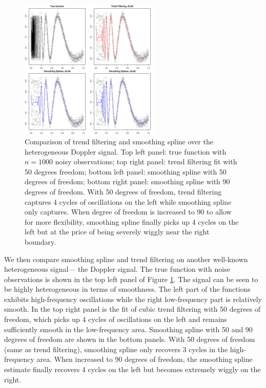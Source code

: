 \documentclass[a4paper]{article}
\begin{document}
\begin{figure}[t]
\centering
\includegraphics[width = 0.6\textwidth]{Figures/Figure5.pdf}
\caption{Comparison of trend filtering and smoothing spline over the heterogeneous Doppler signal. Top left panel: true function with $n = 1000$ noisy observations; top right panel: trend filtering fit with 50 degrees freedom; bottom left panel: smoothing spline with 50 degrees of freedom; bottom right panel: smoothing spline with 90 degrees of freedom. With 50 degrees of freedom, trend filtering captures 4 cycles of oscillations on the left while smoothing spline only captures. When degree of freedom is increased to 90 to allow for more flexibility, smoothing spline finally picks up 4 cycles on the left but at the price of being severely wiggly near the right boundary.}
\label{fig:Figure5_ssvstfdoppler}
\end{figure}

We then compare smoothing spline and trend filtering on another well-known heterogeneous signal--- the Doppler signal. The true function with noise observations is shown in the top left panel of Figure \ref{fig:Figure5_ssvstfdoppler}. The signal can be seen to be highly heterogeneous in terms of smoothness. The left part of the functions exhibits high-frequency oscillations while the right low-frequency part is relatively smooth. In the top right panel is the fit of cubic trend filtering with 50 degrees of freedom, which picks up 4 cycles of oscillations on the left and remains sufficiently smooth in the low-frequency area. Smoothing spline with 50 and 90 degrees of freedom are shown in the bottom panels. With 50 degrees of freedom (same as trend filtering), smoothing spline only recovers 3 cycles in the high-frequency area. When increased to 90 degrees of freedom, the smoothing spline estimate finally recovers 4 cycles on the left but becomes extremely wiggly on the right. 
\end{document}
